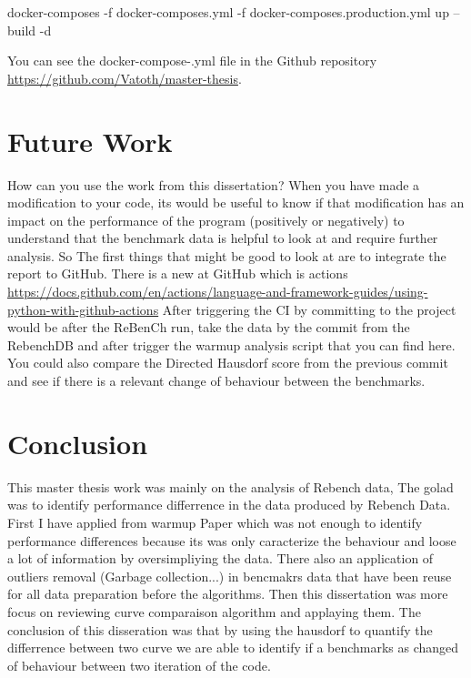 \documentclass{article}
\begin{document}
docker-composes -f docker-composes.yml -f docker-composes.production.yml up --build -d

You can see the docker-compose-.yml file in the Github repository \url{https://github.com/Vatoth/master-thesis}. 


\section{Future Work}

How can you use the work from this dissertation?
When you have made a modification to your code, its would be useful to know if that modification has an impact on the performance of the program (positively or negatively) to understand that the benchmark data is helpful to look at and require further analysis. So The first things that might be good to look at are to integrate the report to GitHub. There is a new  at GitHub which is  actions \url{https://docs.github.com/en/actions/language-and-framework-guides/using-python-with-github-actions}
After triggering the CI by committing to the project would be after the ReBenCh run, take the data by the commit from the RebenchDB and after trigger the warmup analysis script that you can find here.
You could also compare the Directed Hausdorf score from the previous commit and see if there is a relevant change of behaviour between the benchmarks. 


\section{Conclusion}


This master thesis work was mainly on the analysis of Rebench data, The golad was to identify performance differrence in the data produced by Rebench Data. First I have applied from \cite{barrett2017virtual} warmup Paper which was not enough to identify performance differences because its was only caracterize the behaviour and loose a lot of information by oversimpliying the data. There also an application of outliers removal (Garbage collection...) in bencmakrs data that have been reuse for all data preparation before the algorithms.  Then this dissertation was more focus on reviewing curve comparaison algorithm and applaying them. The conclusion of this disseration was that by using the hausdorf to quantify the differrence between two curve we are able to identify if a benchmarks as changed of behaviour between two iteration of the code.

\end{document}
